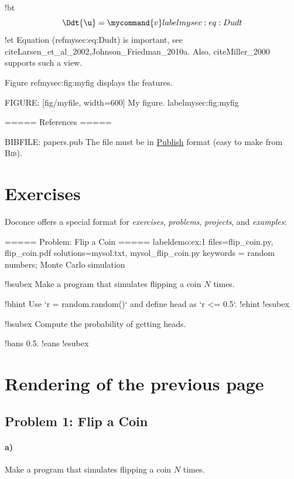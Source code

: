\documentclass[%
twoside,                 %
draft,                   %
final,                   %
chapterprefix=true,      %
open=right               %
10pt]{book}
\newcounter{doconce:movie:counter}
\newenvironment{doconce:exercise}{}{}
\newcounter{doconce:exercise:counter}
\begin{document}
\begin{shadedquoteBlue}
!bt
\begin{equation}
\Ddt{\u} = \mycommand{v} label{mysec:eq:Dudt}
\end{equation}
!et
Equation (ref{mysec:eq:Dudt}) is important, see
cite{Larsen_et_al_2002,Johnson_Friedman_2010a}.
Also, cite{Miller_2000} supports such a view.

Figure ref{mysec:fig:myfig} displays the features.

FIGURE: [fig/myfile, width=600] My figure. label{mysec:fig:myfig}

===== References =====

BIBFILE: papers.pub
\eccq
The  file must be in \href{{https://bitbucket.org/logg/publish}}{Publish}
format (easy to make from \textsc{Bib}\negthinspace{\TeX}).

\section*{Exercises}

Doconce offers a special format for \emph{exercises}, \emph{problems}, \emph{projects},
and \emph{examples}:

\bccq
===== Problem: Flip a Coin =====
label{demo:ex:1}
files=flip_coin.py, flip_coin.pdf
solutions=mysol.txt, mysol_flip_coin.py
keywords = random numbers; Monte Carlo simulation

!bsubex
Make a program that simulates flipping a coin $N$ times.

!bhint
Use `r = random.random()` and define head as `r <= 0.5`.
!ehint
!esubex

!bsubex
Compute the probability of getting heads.

!bans
0.5.
!eans
!esubex
\eccq

\section*{Rendering of the previous page}




\begin{doconce:exercise}

\subsection*{Problem 1: Flip a Coin}


\paragraph{a)}
Make a program that simulates flipping a coin $N$ times.


\end{doconce:exercise}
\end{shadedquoteBlue}
\end{document}
